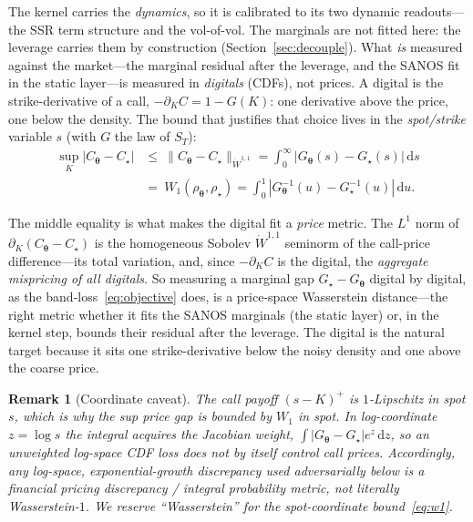 \documentclass[11pt]{article}
\newtheorem{remark}{Remark}
\newcommand{\dd}{\,\mathrm{d}}
\newcommand{\bth}{{\boldsymbol{\theta}}}
\begin{document}
The kernel carries the \emph{dynamics}, so it is calibrated to its two dynamic readouts---the SSR term
structure and the vol-of-vol. The marginals are not fitted here: the leverage carries them by
construction (Section~\ref{sec:decouple}). What \emph{is} measured against the market---the marginal
residual after the leverage, and the SANOS fit in the static layer---is measured in \emph{digitals}
(CDFs), not prices. A digital is the strike-derivative of a call, $-\partial_K C=1-G(K)$: one derivative
above the price, one below the density. The bound that justifies that choice lives in the
\emph{spot/strike} variable $s$ (with $G$ the law of $S_T$):
\begin{equation}
\begin{aligned}
\sup_K|C_\bth-C_\star|
&\le\ \|C_\bth-C_\star\|_{\dot W^{1,1}}
=\int_0^\infty|G_\bth(s)-G_\star(s)|\dd s\\
&=\ W_1(\rho_\bth,\rho_\star)=\int_0^1|G_\bth^{-1}(u)-G_\star^{-1}(u)|\dd u.
\end{aligned}
\label{eq:w1}
\end{equation}

The middle equality is what makes the digital fit a \emph{price} metric. The $L^1$ norm of
$\partial_K(C_\bth-C_\star)$ is the homogeneous Sobolev $\dot W^{1,1}$ seminorm of the call-price
difference---its total variation, and, since $-\partial_K C$ is the digital, the \emph{aggregate
mispricing of all digitals}. So measuring a marginal gap $G_\star-G_\bth$ digital by digital, as the
band-loss~\eqref{eq:objective} does, is a price-space Wasserstein distance---the right metric whether it
fits the SANOS marginals (the static layer) or, in the kernel step, bounds their residual after the
leverage. The digital is the natural target because it sits one strike-derivative below the noisy density
and one above the coarse price.

\begin{remark}[Coordinate caveat]
The call payoff $(s-K)^+$ is $1$-Lipschitz in spot $s$, which is why the sup price gap
is bounded by $W_1$ in spot. In log-coordinate $z=\log s$ the integral acquires the
Jacobian weight, $\int|G_\bth-G_\star|e^z\dd z$, so an unweighted log-space CDF loss
does not by itself control call prices. Accordingly, any log-space, exponential-growth
discrepancy used adversarially below is a financial pricing discrepancy / integral
probability metric, not literally Wasserstein-$1$. We reserve ``Wasserstein'' for the
spot-coordinate bound~\eqref{eq:w1}.
\end{remark}
\end{document}
